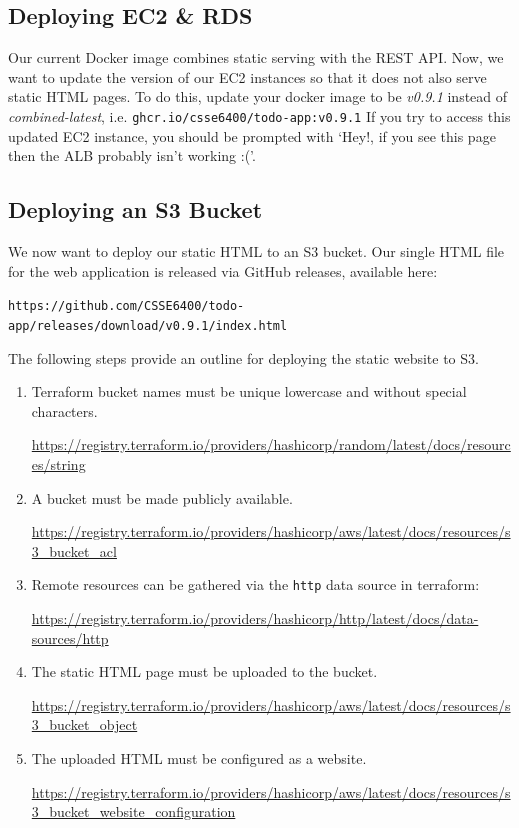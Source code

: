 \documentclass{csse4400}
\begin{document}
\subsection{Deploying EC2 \& RDS}
Our current Docker image combines static serving with the REST API.
Now, we want to update the version of our EC2 instances so that it does not also serve static HTML pages.
To do this,
update your docker image to be \textsl{v0.9.1} instead of \textsl{combined-latest},
i.e. \texttt{ghcr.io/csse6400/todo-app:v0.9.1}
If you try to access this updated EC2 instance, 
you should be prompted with `Hey!, if you see this page then the ALB probably isn't working :('.

\subsection{Deploying an S3 Bucket}
We now want to deploy our static HTML to an S3 bucket.
Our single HTML file for the web application is released via GitHub releases, available here:

\noindent\texttt{https://github.com/CSSE6400/todo-app/releases/download/v0.9.1/index.html}

\noindent The following steps provide an outline for deploying the static website to S3.

\begin{enumerate}
  \item Terraform bucket names must be unique lowercase and without special characters.
  
  \url{https://registry.terraform.io/providers/hashicorp/random/latest/docs/resources/string}

  \item A bucket must be made publicly available.
  
  \url{https://registry.terraform.io/providers/hashicorp/aws/latest/docs/resources/s3_bucket_acl}

  \item Remote resources can be gathered via the \texttt{http} data source in terraform: 
  
  \url{https://registry.terraform.io/providers/hashicorp/http/latest/docs/data-sources/http}

  \item The static HTML page must be uploaded to the bucket.
  
  \url{https://registry.terraform.io/providers/hashicorp/aws/latest/docs/resources/s3_bucket_object}

  \item The uploaded HTML must be configured as a website.
  
  \url{https://registry.terraform.io/providers/hashicorp/aws/latest/docs/resources/s3_bucket_website_configuration}
\end{enumerate}
\end{document}
